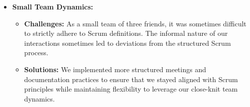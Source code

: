 \documentclass[11pt,a4paper]{article}
\begin{document}
\begin{itemize}
        \item \textbf{Small Team Dynamics:}
        \begin{itemize}
            \item \textbf{Challenges:} As a small team of three friends, it was sometimes difficult to strictly adhere to Scrum definitions. The informal nature of our interactions sometimes led to deviations from the structured Scrum process.
            \item \textbf{Solutions:} We implemented more structured meetings and documentation practices to ensure that we stayed aligned with Scrum principles while maintaining flexibility to leverage our close-knit team dynamics.
        \end{itemize}
    \end{itemize}
\end{document}
